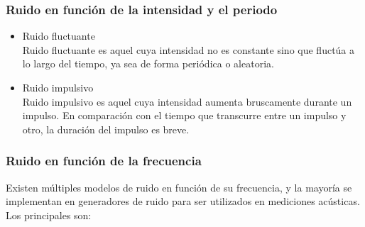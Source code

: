 \subsubsection{Ruido en función de la intensidad y el periodo}

\begin{itemize}

\item Ruido fluctuante\\
Ruido fluctuante es aquel cuya intensidad no es constante sino que fluctúa a lo largo del tiempo, ya sea de forma periódica o aleatoria.
\item Ruido impulsivo\\
Ruido impulsivo es aquel cuya intensidad aumenta bruscamente durante un impulso. En comparación con el tiempo que transcurre entre un impulso y otro, la duración del impulso es breve.

\end{itemize}

\subsubsection{Ruido en función de la frecuencia}
Existen múltiples modelos de ruido en función de su frecuencia, y la mayoría se implementan en generadores de ruido para ser utilizados en mediciones acústicas. Los principales son:

